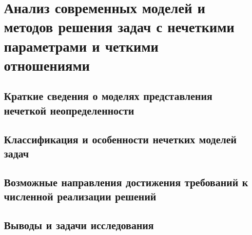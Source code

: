 \chapter{Анализ современных моделей и методов решения задач с нечеткими параметрами и четкими отношениями}
\label{chapter1}

\section{Краткие сведения о моделях представления нечеткой неопределенности}
\label{chapter1_1}


\section{Классификация и особенности нечетких моделей задач} 
\label{chapter1_2}


\section{Возможные направления достижения требований к численной реализации решений} 
\label{chapter1_3}


\section{Выводы и задачи исследования} 
\label{chapter1_4}
